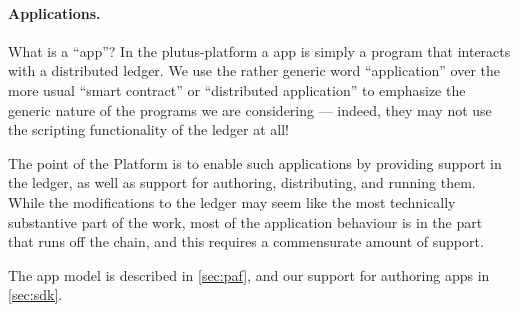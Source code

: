 \documentclass[plutus.tex]{subfiles}
\begin{document}
\paragraph{Applications.}
What is a ``\gls{app}''?
In the \gls{plutus-platform} a \gls{app} is simply a program that interacts with a distributed ledger.
We use the rather generic word ``application'' over the more usual ``smart contract'' or ``distributed application'' to emphasize the generic nature of the programs we are considering --- indeed, they may not use the scripting functionality of the ledger at all!

The point of the Platform is to enable such applications by providing support in the ledger, as well as support for authoring, distributing, and running them.
While the modifications to the ledger may seem like the most technically substantive part of the work, most of the application behaviour is in the part that runs off the chain, and this requires a commensurate amount of support.

The \gls{app} model is described in \cref{sec:paf}, and our support for authoring \glspl{app} in \cref{sec:sdk}.
\end{document}
